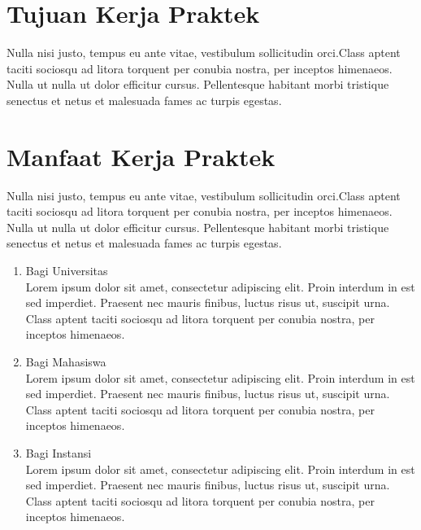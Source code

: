 \section{Tujuan Kerja Praktek}
Nulla nisi justo, tempus eu ante vitae, vestibulum sollicitudin orci.Class aptent taciti sociosqu ad litora torquent per conubia nostra, per inceptos himenaeos. Nulla ut nulla ut dolor efficitur cursus. Pellentesque habitant morbi tristique senectus et netus et malesuada fames ac turpis egestas.

\section{Manfaat Kerja Praktek}
Nulla nisi justo, tempus eu ante vitae, vestibulum sollicitudin orci.Class aptent taciti sociosqu ad litora torquent per conubia nostra, per inceptos himenaeos. Nulla ut nulla ut dolor efficitur cursus. Pellentesque habitant morbi tristique senectus et netus et malesuada fames ac turpis egestas.
\begin{enumerate}
      \item Bagi Universitas \\
            Lorem ipsum dolor sit amet, consectetur adipiscing elit. Proin interdum in est sed imperdiet. Praesent nec mauris finibus, luctus risus ut, suscipit urna. Class aptent taciti sociosqu ad litora torquent per conubia nostra, per inceptos himenaeos.
      \item Bagi Mahasiswa \\
            Lorem ipsum dolor sit amet, consectetur adipiscing elit. Proin interdum in est sed imperdiet. Praesent nec mauris finibus, luctus risus ut, suscipit urna. Class aptent taciti sociosqu ad litora torquent per conubia nostra, per inceptos himenaeos.
      \item Bagi Instansi \\
            Lorem ipsum dolor sit amet, consectetur adipiscing elit. Proin interdum in est sed imperdiet. Praesent nec mauris finibus, luctus risus ut, suscipit urna. Class aptent taciti sociosqu ad litora torquent per conubia nostra, per inceptos himenaeos.
\end{enumerate}

